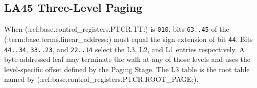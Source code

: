 \subsection{LA45 Three-Level Paging}

When (:ref:base.control_registers.PTCR.TT:) is \texttt{010}, bits \texttt{63..45} of the (:term:base.terms.linear_address:) must equal the sign extension of bit
\texttt{44}. Bits \texttt{44..34}, \texttt{33..23}, and \texttt{22..14} select the L3, L2, and L1 entries respectively. A byte-addressed
leaf may terminate the walk at any of those levels and uses the level-specific offset defined by the Paging Stage. The L3 table is the root
table named by (:ref:base.control_registers.PTCR.ROOT_PAGE:).



\clearpage

